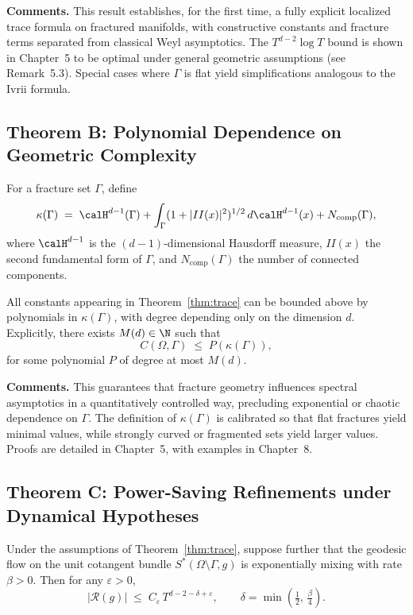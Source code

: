 \noindent
\textbf{Comments.}
This result establishes, for the first time, a fully explicit localized
trace formula on fractured manifolds, with constructive constants and
fracture terms separated from classical Weyl asymptotics. The
$T^{d-2}\log T$ bound is shown in Chapter~5 to be optimal under general
geometric assumptions (see Remark~5.3). Special cases where $\Gamma$ is
flat yield simplifications analogous to the Ivrii formula.

\subsection*{Theorem B: Polynomial Dependence on Geometric Complexity}
\begin{definition}
For a fracture set $\Gamma$, define
\[
    \kappa(\Gamma) \;=\;
    \calH^{d-1}(\Gamma)
    + \int_\Gamma (1 + |II(x)|^2)^{1/2}\, d\calH^{d-1}(x)
    + N_{\text{comp}}(\Gamma),
\]
where $\calH^{d-1}$ is the $(d-1)$-dimensional Hausdorff measure,
$II(x)$ the second fundamental form of $\Gamma$, and
$N_{\text{comp}}(\Gamma)$ the number of connected components.
\end{definition}

\begin{proposition}\label{prop:poly}
All constants appearing in Theorem~\ref{thm:trace} can be bounded above
by polynomials in $\kappa(\Gamma)$, with degree depending only on the
dimension $d$. Explicitly, there exists $M(d) \in \N$ such that
\[
    C(\Omega,\Gamma) \;\leq\; P(\kappa(\Gamma)),
\]
for some polynomial $P$ of degree at most $M(d)$.
\end{proposition}

\noindent
\textbf{Comments.}
This guarantees that fracture geometry influences spectral asymptotics
in a quantitatively controlled way, precluding exponential or chaotic
dependence on $\Gamma$. The definition of $\kappa(\Gamma)$ is calibrated
so that flat fractures yield minimal values, while strongly curved or
fragmented sets yield larger values. Proofs are detailed in
Chapter~5, with examples in Chapter~8.

\subsection*{Theorem C: Power-Saving Refinements under Dynamical Hypotheses}
\begin{theorem}\label{thm:refined}
Under the assumptions of Theorem~\ref{thm:trace}, suppose further that
the geodesic flow on the unit cotangent bundle $S^*(\Omega\setminus\Gamma,g)$
is exponentially mixing with rate $\beta>0$. Then for any $\varepsilon>0$,
\[
    |\mathcal{R}(g)|
    \;\leq\;
    C_\varepsilon\,
    T^{d-2-\delta+\varepsilon},
    \qquad
    \delta = \min\!\left(\tfrac{1}{2},\, \tfrac{\beta}{4}\right).
\]
\end{theorem}

